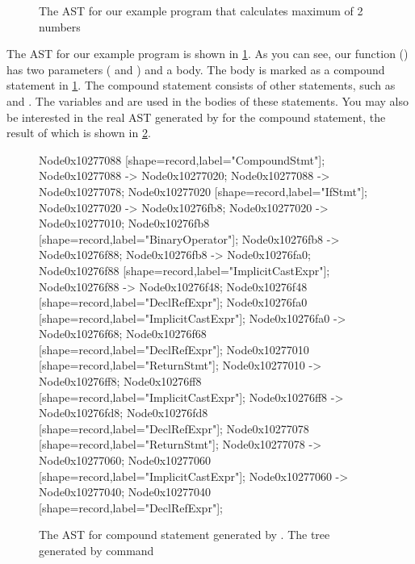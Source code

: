 \begin{center}
  \begin{figure}
    \caption{The AST for our example program that calculates maximum of 2 numbers
    }  
    \label{fig:ast}
  \end{figure}
\end{center}

The AST for our example program is shown in \cref{fig:ast}. As you can see, our
function (\myshell{max}) has two parameters (\myshell{a} and \myshell{b}) and a
body. The body is marked as a compound statement in \cref{fig:ast}. The compound
statement consists of other statements, such as \myshell{return} and
\myshell{if}. The variables \myshell{a} and \myshell{b} are used in the bodies
of these statements. You may also be interested in the real AST generated by
\clang for the compound statement, the result of which is shown in
\cref{fig:ast2}. 

\begin{center}
  \begin{figure}
     {
      Node0x10277088 [shape=record,label="{CompoundStmt}"];
      Node0x10277088 -> Node0x10277020;
      Node0x10277088 -> Node0x10277078;
      Node0x10277020 [shape=record,label="{IfStmt}"];
      Node0x10277020 -> Node0x10276fb8;
      Node0x10277020 -> Node0x10277010;
      Node0x10276fb8 [shape=record,label="{BinaryOperator}"];
      Node0x10276fb8 -> Node0x10276f88;
      Node0x10276fb8 -> Node0x10276fa0;
      Node0x10276f88 [shape=record,label="{ImplicitCastExpr}"];
      Node0x10276f88 -> Node0x10276f48;
      Node0x10276f48 [shape=record,label="{DeclRefExpr}"];
      Node0x10276fa0 [shape=record,label="{ImplicitCastExpr}"];
      Node0x10276fa0 -> Node0x10276f68;
      Node0x10276f68 [shape=record,label="{DeclRefExpr}"];
      Node0x10277010 [shape=record,label="{ReturnStmt}"];
      Node0x10277010 -> Node0x10276ff8;
      Node0x10276ff8 [shape=record,label="{ImplicitCastExpr}"];
      Node0x10276ff8 -> Node0x10276fd8;
      Node0x10276fd8 [shape=record,label="{DeclRefExpr}"];
      Node0x10277078 [shape=record,label="{ReturnStmt}"];
      Node0x10277078 -> Node0x10277060;
      Node0x10277060 [shape=record,label="{ImplicitCastExpr}"];
      Node0x10277060 -> Node0x10277040;
      Node0x10277040 [shape=record,label="{DeclRefExpr}"];
    }
    \caption{The AST for compound statement generated by \clang. The tree
      generated by \myshell{clang -cc1 -ast-view <...>} command} 
    \label{fig:ast2}
  \end{figure}
\end{center}

